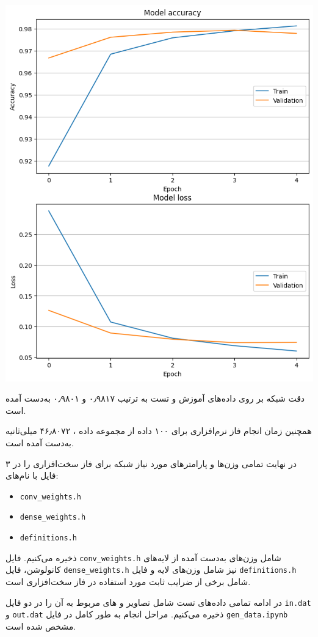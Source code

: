 \begin{qsolve}
	\begin{center}
		\includegraphics*[width=0.7\linewidth]{pics/img4.png}
		\label{نمودارهای Loss و Accuracy}
	\end{center}
	
	دقت شبکه بر روی داده‌های آموزش و تست به ترتیب ۰٫۹۸۱۷ و ۰٫۹۸۰۱ به‌دست آمده است.
	
	همچنین زمان انجام فاز  نرم‌افزاری برای ۱۰۰ داده از مجموعه داده ، ۴۶٫۸۰۷۲ میلی‌ثانیه به‌دست آمده است.
	
	در نهایت تمامی وزن‌ها و پارامتر‌های مورد نیاز شبکه برای فاز سخت‌افزاری را در ۳ فایل با نام‌های:
	
	\begin{latin}
		\begin{itemize}
			\item 
			\texttt{conv\_weights.h}
			
			\item 
			\texttt{dense\_weights.h}
			
			\item 
			\texttt{definitions.h}
		\end{itemize}
	\end{latin}
	
	ذخیره می‌کنیم. فایل \texttt{conv\_weights.h} شامل وزن‌های به‌دست آمده از لایه‌های کانولوشن، فایل \texttt{dense\_weights.h} نیز شامل وزن‌های لایه  و فایل \texttt{definitions.h} شامل برخی از ضرایب ثابت مورد استفاده در فاز سخت‌افزاری است.
	
	در ادامه تمامی داده‌های تست  شامل تصاویر و  های مربوط به آن را در دو فایل \texttt{in.dat} و \texttt{out.dat} ذخیره می‌کنیم. مراحل انجام به طور کامل در فایل \texttt{gen\_data.ipynb} مشخص شده است.

\end{qsolve}



